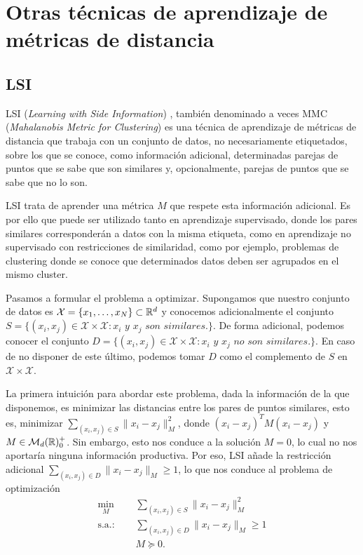 \section{Otras técnicas de aprendizaje de métricas de distancia}

\subsection{LSI} \label{lsi}

LSI (\emph{Learning with Side Information}) \cite{lsi}, también denominado a veces MMC (\emph{Mahalanobis Metric for Clustering}) es una técnica de aprendizaje de métricas de distancia que trabaja con un conjunto de datos, no necesariamente etiquetados, sobre los que se conoce, como información adicional, determinadas parejas de puntos que se sabe que son similares y, opcionalmente, parejas de puntos que se sabe que no lo son.

LSI trata de aprender una métrica $M$ que respete esta información adicional. Es por ello que puede ser utilizado tanto en aprendizaje supervisado, donde los pares similares corresponderán a datos con la misma etiqueta, como en aprendizaje no supervisado con restricciones de similaridad, como por ejemplo, problemas de clustering donde se conoce que determinados datos deben ser agrupados en el mismo cluster.

Pasamos a formular el problema a optimizar. Supongamos que nuestro conjunto de datos es $\mathcal{X} = \{x_1,\dots,x_N\} \subset \mathbb{R}^d$ y conocemos adicionalmente el conjunto $S = \{(x_i,x_j) \in \mathcal{X}\times\mathcal{X} \colon x_i \textit{ y } x_j \textit{ son similares.}\}$. De forma adicional, podemos conocer el conjunto $D = \{(x_i,x_j) \in \mathcal{X}\times\mathcal{X} \colon x_i \textit{ y } x_j \textit{ no son similares.} \}$. En caso de no disponer de este último, podemos tomar $D$ como el complemento de $S$ en $\mathcal{X} \times \mathcal{X}$.

La primera intuición para abordar este problema, dada la información de la que disponemos, es minimizar las distancias entre los pares de puntos similares, esto es, minimizar $\sum_{(x_i,x_j)\in S} \|x_i - x_j \|_M^2$, donde $(x_i - x_j)^T M (x_i - x_j)$ y $M \in \mathcal{M}_{d}(\mathbb{R})^+_0$. Sin embargo, esto nos conduce a la solución $M = 0$, lo cual no nos aportaría ninguna información productiva. Por eso, LSI añade la restricción adicional $\sum_{(x_i,x_j) \in D} \|x_i - x_j\|_M \ge 1$, lo que nos conduce al problema de optimización
\begin{equation} \label{eq:lsi}
\begin{split}
    \min_{M} &\quad \sum_{(x_i,x_j)\in S}  \|x_i - x_j \|_M^2 \\
    \text{s.a.: } &\quad \sum_{(x_i,x_j) \in D} \|x_i - x_j\|_M \ge 1 \\
                  &\quad M \succeq 0.
\end{split}
\end{equation}


